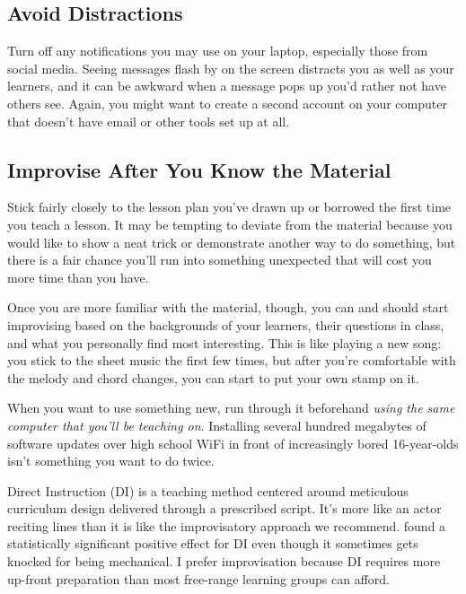 \subsection*{Avoid Distractions}

Turn off any notifications you may use on your laptop,
especially those from social media.
Seeing messages flash by on the screen distracts you as well as your learners,
and it can be awkward when a message pops up you'd rather not have others see.
Again,
you might want to create a second account on your computer
that doesn't have email or other tools set up at all.

\subsection*{Improvise After You Know the Material}

Stick fairly closely to the lesson plan you've drawn up or borrowed
the first time you teach a lesson.
It may be tempting to deviate from the material
because you would like to show a neat trick or demonstrate another way to do something,
but there is a fair chance you'll run into something unexpected
that will cost you more time than you have.

Once you are more familiar with the material,
though,
you can and should start improvising based on the backgrounds of your learners,
their questions in class,
and what you personally find most interesting.
This is like playing a new song:
you stick to the sheet music the first few times,
but after you're comfortable with the melody and chord changes,
you can start to put your own stamp on it.

When you want to use something new,
run through it beforehand
\emph{using the same computer that you'll be teaching on}.
Installing several hundred megabytes of software updates over high school WiFi
in front of increasingly bored 16-year-olds isn't something you want to do twice.

\begin{aside}{Direct Instruction}
   (DI) is a teaching method
  centered around meticulous curriculum design delivered through a prescribed script.
  It's more like an actor reciting lines than it is like the improvisatory approach we recommend.
  \cite{Stoc2018} found a statistically significant positive effect for DI
  even though it sometimes gets knocked for being mechanical.
  I prefer improvisation because DI requires more up-front preparation
  than most free-range learning groups can afford.
\end{aside}

